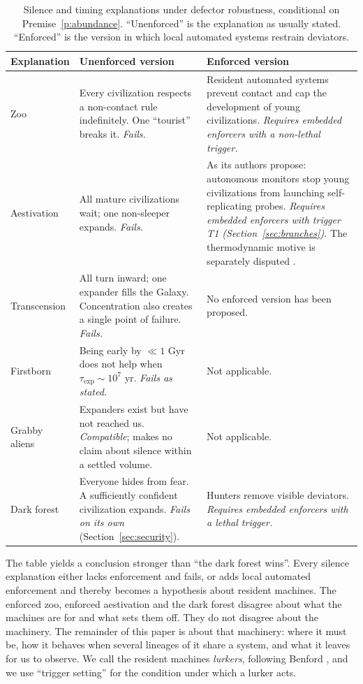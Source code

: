 \documentclass[preprint,12pt]{elsarticle}
\theoremstyle{definition}
\begin{document}
\begin{table}[!htbp]
\centering
\caption{Silence and timing explanations under defector robustness, conditional on Premise~\ref{p:abundance}. ``Unenforced'' is the explanation as usually stated. ``Enforced'' is the version in which local automated systems restrain deviators.}
\label{tab:eval}
\small
\begin{tabularx}{\textwidth}{@{}l>{\raggedright\arraybackslash}X>{\raggedright\arraybackslash}X@{}}
\toprule
Explanation & Unenforced version & Enforced version \\
\midrule
Zoo \citep{Ball1973} & Every civilization respects a non-contact rule indefinitely. One ``tourist'' breaks it. \emph{Fails.} & Resident automated systems prevent contact and cap the development of young civilizations. \emph{Requires embedded enforcers with a non-lethal trigger.} \\
Aestivation \citep{Sandberg2017} & All mature civilizations wait; one non-sleeper expands. \emph{Fails.} & As its authors propose: autonomous monitors stop young civilizations from launching self-replicating probes. \emph{Requires embedded enforcers with trigger T1 (Section~\ref{sec:branches}).} The thermodynamic motive is separately disputed \citep{Bennett2019}. \\
Transcension \citep{Smart2012} & All turn inward; one expander fills the Galaxy. Concentration also creates a single point of failure. \emph{Fails.} & No enforced version has been proposed. \\
Firstborn \citep{Lineweaver2001} & Being early by $\ll 1$ Gyr does not help when $\tau_{\text{exp}} \sim 10^{7}$ yr. \emph{Fails as stated.} & Not applicable. \\
Grabby aliens \citep{Hanson2021} & Expanders exist but have not reached us. \emph{Compatible}; makes no claim about silence within a settled volume. & Not applicable. \\
Dark forest \citep{Liu2008,Yu2015} & Everyone hides from fear. A sufficiently confident civilization expands. \emph{Fails on its own} (Section~\ref{sec:security}). & Hunters remove visible deviators. \emph{Requires embedded enforcers with a lethal trigger.} \\
\bottomrule
\end{tabularx}
\end{table}

The table yields a conclusion stronger than ``the dark forest wins''. Every silence explanation either lacks enforcement and fails, or adds local automated enforcement and thereby becomes a hypothesis about resident machines. The enforced zoo, enforced aestivation and the dark forest disagree about what the machines are for and what sets them off. They do not disagree about the machinery. The remainder of this paper is about that machinery: where it must be, how it behaves when several lineages of it share a system, and what it leaves for us to observe. We call the resident machines \emph{lurkers}, following Benford \citep{Benford2019}, and we use ``trigger setting'' for the condition under which a lurker acts.
\end{document}
